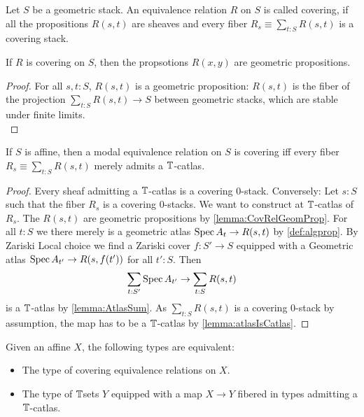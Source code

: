 	\begin{definition}{\label{def:coveringEqRel}}
		Let $S$ be a geometric stack. An equivalence relation $R$ on $S$ is called covering, if all the propositions $R(s,t)$ are sheaves and every fiber $R_s \equiv \sum_{t: S} R(s,t)$ is a covering stack. 
	\end{definition}
\begin{lemma}{\label{lemma:CovRelGeomProp}}
	If $R$ is covering on $S$, then the propsotions $R(x,y)$ are geometric propositions.
\end{lemma}
\begin{proof}
	 For all $s , t : S$, $R(s,t)$ is a geometric proposition: $R(s,t)$ is the fiber of the projection $\sum_{t : S} R(s,t) \to S$ between geometric stacks, which are stable under finite limits. \\
\end{proof}
\begin{lemma}
	If $S$ is affine, then a modal equivalence relation on $S$ is covering iff every fiber $R_s \equiv \sum_{t: S} R(s,t)$ merely admits a $\mathbb{T}$-catlas.
\end{lemma}
\begin{proof}
	Every sheaf admitting a $\mathbb{T}$-catlas is a covering 0-stack. 
	Conversely: Let $s : S$ such that the fiber $R_s$ is a covering 0-stacks. We want to construct at $\mathbb{T}$-catlas of $R_s$.
	The $R(s,t)$ are geometric propositions by \ref{lemma:CovRelGeomProp}.
	For all $t : S$ we there merely is a geometric atlas $\operatorname{Spec} A_t \to R(s,t)$ by \ref{def:algprop}. By Zariski Local choice we find a Zariski cover $f : S' \to S$ equipped with a Geometric atlas $\operatorname{Spec} A_{t'} \to R(s,f (t'))$ for all $t' : S$. Then
	\[
	\sum_{t:S'} \operatorname{Spec} A_{t'} \to \sum_{t : S} R(s,t)
	\]
	is a $\mathbb{T}$-atlas by \ref{lemma:AtlasSum}. As $\sum_{t : S} R(s,t)$ is a covering 0-stack by assumption, the map has to be a $\mathbb{T}$-catlas by \ref{lemma:atlasIsCatlas}. 
\end{proof}

\begin{lemma}{\label{lemma:fundamental-property-algebraic-spaces}}
	Given an affine $X$, the following types are equivalent:
	\begin{itemize}
		\item The type of covering equivalence relations on $X$.
		\item The type of $\mathbb{T}$sets $Y$ equipped with a map $X \to Y$ fibered in types admitting a $\mathbb{T}$-catlas.
	\end{itemize}
\end{lemma}

